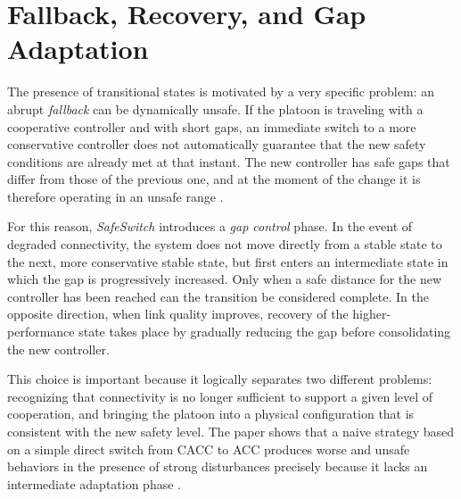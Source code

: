\section{Fallback, Recovery, and Gap Adaptation}
\label{sec:s5g_gap}

The presence of transitional states is motivated by a very specific problem: an abrupt \emph{fallback} can be dynamically unsafe. If the platoon is traveling with a cooperative controller and with short gaps, an immediate switch to a more conservative controller does not automatically guarantee that the new safety conditions are already met at that instant. The new controller has safe gaps that differ from those of the previous one, and at the moment of the change it is therefore operating in an unsafe range \cite{ploeg2015graceful,segata2023multi-technology}.

For this reason, \emph{SafeSwitch} introduces a \emph{gap control} phase. In the event of degraded connectivity, the system does not move directly from a stable state to the next, more conservative stable state, but first enters an intermediate state in which the gap is progressively increased. Only when a safe distance for the new controller has been reached can the transition be considered complete. In the opposite direction, when link quality improves, recovery of the higher-performance state takes place by gradually reducing the gap before consolidating the new controller.

This choice is important because it logically separates two different problems: recognizing that connectivity is no longer sufficient to support a given level of cooperation, and bringing the platoon into a physical configuration that is consistent with the new safety level. The paper shows that a naive strategy based on a simple direct switch from CACC to ACC produces worse and unsafe behaviors in the presence of strong disturbances precisely because it lacks an intermediate adaptation phase \cite{segata2023multi-technology}.
